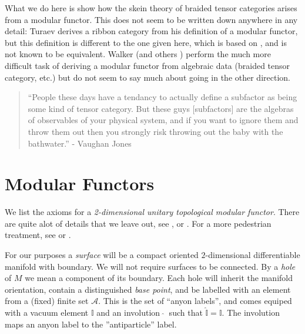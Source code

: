 \documentclass[aps, prl, letterpaper, twocolumn, superscriptaddress, notitlepage, 10pt]{revtex4-1}
\newcommand{\vac}{\mathbb{I}}
\newcommand{\A}{\mathcal{A}}
\begin{document}
What we do here is show how the skein theory of
braided tensor categories arises from a modular functor.
This does not seem to be written down anywhere in any
detail: Turaev \cite{Turaev1994} derives a ribbon category
from his definition of a modular functor, but this
definition is different to the one given here, which is
based on \cite{Walker1991}, and is not known to be equivalent.
Walker \cite{Walker1991}
(and others \cite{Bakalov2001}) perform the much more
difficult task of deriving a modular functor from
algebraic data (braided tensor category, etc.)
but do not seem to say much about going in the other direction.


\begin{quotation}
``People these days have a tendancy 
to actually define a subfactor as being some kind of
tensor category.
But these guys [subfactors] are the algebras of observables
of your physical system, and if you want to
ignore them and throw them out then you strongly
risk throwing out the baby with the bathwater.''
- Vaughan Jones~\cite{Jones2015}
\end{quotation}

\section{Modular Functors}

We list the axioms for a 
\emph{2-dimensional unitary topological modular functor}.
There are quite alot of details that we leave out,
see
\cite{Turaev1994}, \cite{Walker1991} or \cite{Bakalov2001}.
For a more pedestrian treatment, see \cite{Freedman2002simulation} or \cite{Beverland2014}.

For our purposes a \emph{surface} will be a compact
oriented $2$-dimensional differentiable manifold with boundary. %
We will not require surfaces to be connected.
By a \emph{hole} of $M$ we mean a component of its boundary. %
Each hole will inherit the manifold orientation,
contain a distinguished \emph{base point},
and be labelled with
an element from a (fixed) finite set $\A.$
This is the set of ``anyon labels'', and comes
equiped with a vacuum element $\vac$ 
and an involution $\ \widehat{}\ $ such that $\widehat{\vac}=\vac.$
The involution maps an anyon label to the ''antiparticle'' label.
\end{document}
